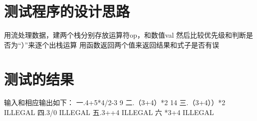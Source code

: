 \documentclass[UTF8]{ctexart}
\begin{document}
\pagestyle{fancy}
\fancyhead{}

\section{测试程序的设计思路}
用流处理数据，建两个栈分别存放运算符op，和数值val
然后比较优先级和判断是否为“）”来逐个出栈运算
用函数返回两个值来返回结果和式子是否有误



\section{测试的结果}
输入和相应输出如下：
一.4+5*4/2-3      9
二.（3+4）*2    14
三.（3+4））*2     ILLEGAL
四.3/0      ILLEGAL
五.3++4     ILLEGAL
六  *3+4    ILLEGAL
\end{document}
